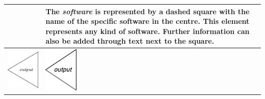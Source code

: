 \begin{longtable}{|m{}|m{}|m{}|}
    & 
    The \textit{software} is represented by a dashed square with the name of the specific software in the centre. This element represents any kind of software. Further information can also be added through text next to the square.
    \\\hline
    \centering
    \includegraphics[width=0.75\linewidth]{chapters/4-MDC_model_application/image/bvl-output-o.png}
    &
    \centering
    \includegraphics[width=0.75\linewidth]{chapters/4-MDC_model_application/image/bvl-output.png}

\end{longtable}
